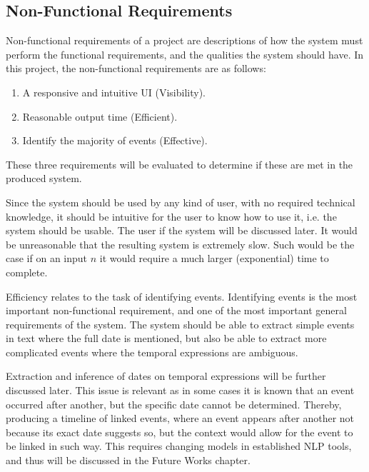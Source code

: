 \subsection{Non-Functional Requirements}
\par Non-functional requirements of a project are descriptions of how the system must perform the functional requirements, and the qualities the system should have. In this project, the non-functional requirements are as follows:
\begin{enumerate}
\item A responsive and intuitive UI (Visibility).
\item Reasonable output time (Efficient).
\item Identify the majority of events (Effective).
\end{enumerate}
\par These three requirements will be evaluated to determine if these are met in the produced system. 
\par Since the system should be used by any kind of user, with no required technical knowledge, it should be intuitive for the user to know how to use it, i.e. the system should be usable. The user if the system will be discussed later. It would be unreasonable that the resulting system is extremely slow. Such would be the case if on an input $n$ it would require a much larger (exponential) time to complete. 
\par Efficiency relates to the task of identifying events. Identifying events is the most important non-functional requirement, and one of the most important general requirements of the system. The system should be able to extract simple events in text where the full date is mentioned, but also be able to extract more complicated events where the temporal expressions are ambiguous. 
\par Extraction and inference of dates on temporal expressions will be further discussed later. This issue is relevant as in some cases it is known that an event occurred after another, but the specific date cannot be determined. Thereby, producing a timeline of linked events, where an event appears after another not because its exact date suggests so, but the context would allow for the event to be linked in such way. This requires changing models in  established NLP tools, and thus will be discussed in the Future Works chapter.

